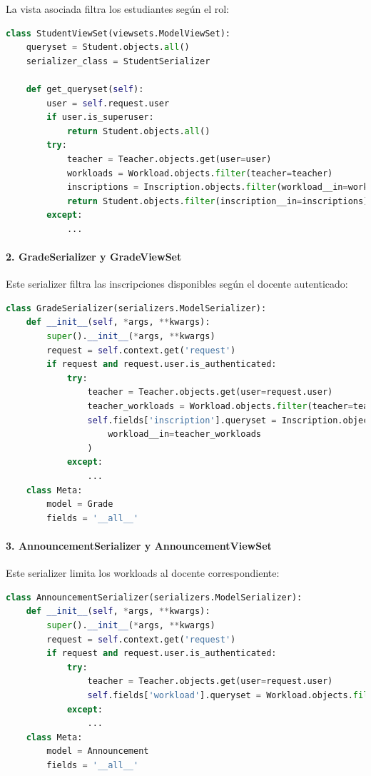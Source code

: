 \documentclass{article}
\begin{document}
La vista asociada filtra los estudiantes según el rol:

\begin{lstlisting}[language=Python, caption={StudentViewSet resumido}]
class StudentViewSet(viewsets.ModelViewSet):
    queryset = Student.objects.all()
    serializer_class = StudentSerializer

    def get_queryset(self):
        user = self.request.user
        if user.is_superuser:
            return Student.objects.all()
        try:
            teacher = Teacher.objects.get(user=user)
            workloads = Workload.objects.filter(teacher=teacher)
            inscriptions = Inscription.objects.filter(workload__in=workloads)
            return Student.objects.filter(inscription__in=inscriptions).distinct()
        except:
            ...
\end{lstlisting}

\paragraph{2. GradeSerializer y GradeViewSet}

Este serializer filtra las inscripciones disponibles según el docente autenticado:

\begin{lstlisting}[language=Python, caption={GradeSerializer filtrando inscripciones}]
class GradeSerializer(serializers.ModelSerializer):
    def __init__(self, *args, **kwargs):
        super().__init__(*args, **kwargs)
        request = self.context.get('request')
        if request and request.user.is_authenticated:
            try:
                teacher = Teacher.objects.get(user=request.user)
                teacher_workloads = Workload.objects.filter(teacher=teacher)
                self.fields['inscription'].queryset = Inscription.objects.filter(
                    workload__in=teacher_workloads
                )
            except:
                ...
    class Meta:
        model = Grade
        fields = '__all__'
\end{lstlisting}

\paragraph{3. AnnouncementSerializer y AnnouncementViewSet}

Este serializer limita los workloads al docente correspondiente:

\begin{lstlisting}[language=Python, caption={AnnouncementSerializer con filtrado}]
class AnnouncementSerializer(serializers.ModelSerializer):
    def __init__(self, *args, **kwargs):
        super().__init__(*args, **kwargs)
        request = self.context.get('request')
        if request and request.user.is_authenticated:
            try:
                teacher = Teacher.objects.get(user=request.user)
                self.fields['workload'].queryset = Workload.objects.filter(teacher=teacher)
            except:
                ...
    class Meta:
        model = Announcement
        fields = '__all__'
\end{lstlisting}
\end{document}
